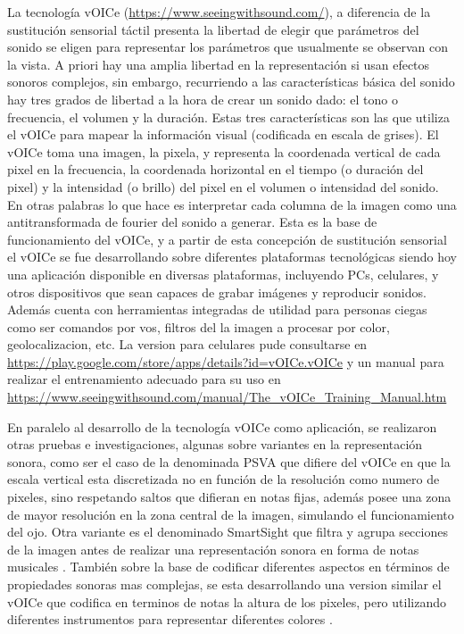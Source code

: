 \documentclass{article}
\begin{document}
    La tecnología vOICe (\url{https://www.seeingwithsound.com/}), a diferencia de la sustitución sensorial táctil presenta la libertad de elegir que parámetros del sonido se eligen para representar los parámetros que usualmente se observan con la vista. A priori hay una amplia libertad en la representación si usan efectos sonoros complejos, sin embargo, recurriendo a las características básica del sonido hay tres grados de libertad a la hora de crear un sonido dado: el tono o frecuencia, el volumen y la duración. Estas tres características son las que utiliza el vOICe para mapear la información visual (codificada en escala de grises). El vOICe toma una imagen, la pixela, y representa la coordenada vertical de cada pixel en la frecuencia, la coordenada horizontal en el tiempo (o duración del pixel) y la intensidad (o brillo) del pixel en el volumen o intensidad del sonido. En otras palabras lo que hace es interpretar cada columna de la imagen como una antitransformada de fourier del sonido a generar. Esta es la base de funcionamiento del vOICe, y a partir de esta concepción de sustitución sensorial el vOICe se fue desarrollando sobre diferentes plataformas tecnológicas siendo hoy una aplicación disponible en diversas plataformas, incluyendo PCs, celulares, y otros dispositivos que sean capaces de grabar imágenes y reproducir sonidos. Además cuenta con herramientas integradas de utilidad para personas ciegas como ser comandos por vos, filtros del la imagen a procesar por color, geolocalizacion, etc. La version para celulares pude consultarse en \url{https://play.google.com/store/apps/details?id=vOICe.vOICe} y un manual para realizar el entrenamiento adecuado para su uso en \url {https://www.seeingwithsound.com/manual/The_vOICe_Training_Manual.htm} 
    
    En paralelo al desarrollo de la tecnología vOICe como aplicación, se realizaron otras pruebas e investigaciones, algunas sobre variantes en la representación sonora, como ser el caso de la denominada PSVA \cite{VoiceVariante1} que difiere del vOICe en que la escala vertical esta discretizada no en función de la resolución como numero de pixeles, sino respetando saltos que difieran en notas fijas, además posee una zona de mayor resolución en la zona central de la imagen, simulando el funcionamiento del ojo. Otra variante es el denominado SmartSight que filtra y agrupa secciones de la imagen antes de realizar una representación sonora en forma de notas musicales \cite{VoiceVariantes2, VoiceVariantes3}. También sobre la base de codificar diferentes aspectos en términos de propiedades sonoras mas complejas, se esta desarrollando una version similar el vOICe que codifica en terminos de notas la altura de los pixeles, pero utilizando diferentes instrumentos para representar diferentes colores \cite{VoiceVariantes4}.
    
\end{document}
